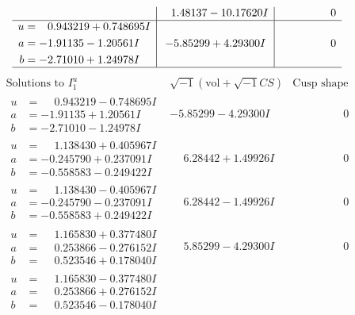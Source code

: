 \documentclass[1p]{elsarticle_modified}
\theoremstyle{definition}
\newcommand{\I}{\sqrt{-1}}
\begin{document}
$$\begin{array}{c|c|c}
 & \phantom{-}1.48137 - 10.17620 I & \phantom{-0.000000 } 0 \\ \hline\begin{aligned}
u &= \phantom{-}0.943219 + 0.748695 I \\
a &= -1.91135 - 1.20561 I \\
b &= -2.71010 + 1.24978 I\end{aligned}
 & -5.85299 + 4.29300 I & \phantom{-0.000000 } 0\\
 \hline 
 \end{array}$$\newpage$$\begin{array}{c|c|c}  
\text{Solutions to }I^u_{1}& \I (\text{vol} + \sqrt{-1}CS) & \text{Cusp shape}\\
 \hline 
\begin{aligned}
u &= \phantom{-}0.943219 - 0.748695 I \\
a &= -1.91135 + 1.20561 I \\
b &= -2.71010 - 1.24978 I\end{aligned}
 & -5.85299 - 4.29300 I & \phantom{-0.000000 } 0 \\ \hline\begin{aligned}
u &= \phantom{-}1.138430 + 0.405967 I \\
a &= -0.245790 + 0.237091 I \\
b &= -0.558583 - 0.249422 I\end{aligned}
 & \phantom{-}6.28442 + 1.49926 I & \phantom{-0.000000 } 0 \\ \hline\begin{aligned}
u &= \phantom{-}1.138430 - 0.405967 I \\
a &= -0.245790 - 0.237091 I \\
b &= -0.558583 + 0.249422 I\end{aligned}
 & \phantom{-}6.28442 - 1.49926 I & \phantom{-0.000000 } 0 \\ \hline\begin{aligned}
u &= \phantom{-}1.165830 + 0.377480 I \\
a &= \phantom{-}0.253866 - 0.276152 I \\
b &= \phantom{-}0.523546 + 0.178040 I\end{aligned}
 & \phantom{-}5.85299 - 4.29300 I & \phantom{-0.000000 } 0 \\ \hline\begin{aligned}
u &= \phantom{-}1.165830 - 0.377480 I \\
a &= \phantom{-}0.253866 + 0.276152 I \\
b &= \phantom{-}0.523546 - 0.178040 I\end{aligned}

\end{array}$$
\end{document}
